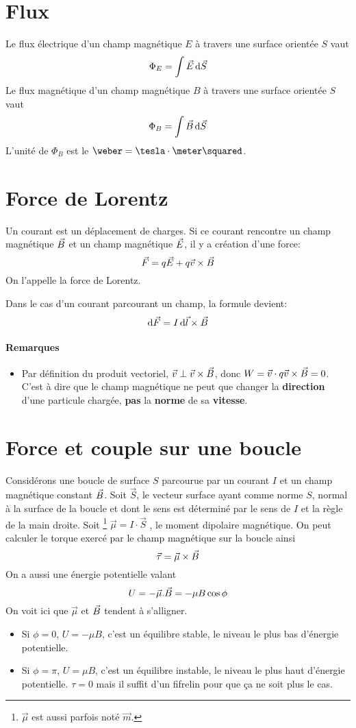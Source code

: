 \section{Flux}
Le flux électrique d'un champ magnétique $E$ à travers une surface orientée $S$ vaut
\[ \Phi_E = \int \vec E \operatorname{d}\! \vec S \]
Le flux magnétique d'un champ magnétique $B$ à travers une surface orientée $S$ vaut
\[ \Phi_B = \int \vec B \operatorname{d}\! \vec S \]
L'unité de $\Phi_B$ est le $\weber = \tesla \cdot \meter \squared$.

\section{Force de Lorentz}
\label{sec:lorentz}
Un courant est un déplacement de charges.
Si ce courant rencontre un champ magnétique $\vec B$ et un champ magnétique $\vec E$, il y a création d'une force:
$$ \vec F = q \vec E + q \vec v \times \vec B $$
On l'appelle la force de Lorentz.

Dans le cas d'un courant parcourant un champ, la formule devient:
$$ \operatorname{d}\! \vec F = I\operatorname{d}\! \vec l \times \vec B $$

\paragraph{Remarques}
\begin{itemize}
	\item Par définition du produit vectoriel, $\vec v \perp \vec v \times \vec B$, donc $W = \vec v \cdot q\vec v \times \vec B = 0$.
		C'est à dire que le champ magnétique ne peut que changer la \textbf{direction} d'une particule chargée,
		\textbf{pas} la \textbf{norme} de sa \textbf{vitesse}.
\end{itemize}

\section{Force et couple sur une boucle}
Considérons une boucle de surface $S$ parcourue par un courant $I$ et un champ magnétique constant $\vec B$.
Soit $\vec S$, le vecteur surface ayant comme norme $S$, normal à la surface de la boucle et dont le sens est déterminé par le sens de $I$ et la règle de la main droite.
Soit
\footnote{$\vec \mu$ est aussi parfois noté $\vec m$.}
$\vec \mu = I \cdot \vec S$
, le moment dipolaire magnétique.
On peut calculer le torque exercé par le champ magnétique sur la boucle ainsi
\[ \vec \tau = \vec \mu \times \vec B \]
On a aussi une énergie potentielle valant
\[ U = -\vec \mu . \vec B = -\mu B \cos \phi \]
On voit ici que $\vec \mu$ et $\vec B$ tendent à s'alligner.
\begin{itemize}
	\item Si $\phi = 0$, $U = - \mu B$, c'est un équilibre stable, le niveau le plus bas d'énergie potentielle.
	\item Si $\phi = \pi$, $U = \mu B$, c'est un équilibre instable, le niveau le plus haut d'énergie potentielle.
		$\tau = 0$ mais il suffit d'un fifrelin pour que ça ne soit plus le cas.
\end{itemize}

